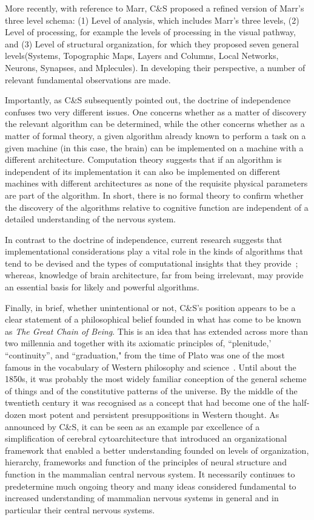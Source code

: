 \documentclass[11pt,3p,twocolumn]{JMN}
\begin{document}
More recently, with reference to Marr, C\&S proposed a refined version of Marr's three level schema: (1) Level of analysis, which includes Marr’s three levels, (2) Level of processing, for example the levels of processing in the visual pathway, and (3) Level of structural organization, for which they proposed seven general levels(Systems, Topographic Maps, Layers and Columns, Local Networks, Neurons, Synapses, and Mplecules). In developing their perspective, a number of relevant fundamental observations are made.

Importantly, as C\&S subsequently pointed out, the doctrine of independence confuses two very different issues. One concerns whether as a matter of discovery the relevant algorithm can be determined, while the other concerns whether as a matter of formal theory, a given algorithm already known to perform a task on a given machine (in this case, the brain) can be implemented on a machine with a different architecture. Computation theory suggests that if an algorithm is independent of its implementation it can also be implemented on different machines with different architectures as none of the requisite physical parameters are part of the algorithm. In short, there is no formal theory to confirm whether the discovery of the algorithms relative to cognitive function are independent of a detailed understanding of the nervous system.

In contrast to the doctrine of independence, current research suggests that implementational considerations play a vital role in the kinds of algorithms that tend to be devised and the types of computational insights that they provide~\citep{Churchland:1992uq}; whereas, knowledge of brain architecture, far from being irrelevant, may provide an essential basis for likely and powerful algorithms.

Finally, in brief, whether unintentional or not, C\&S's position appears to be a clear statement of a philosophical belief founded in what has come to be known as {\it{The Great Chain of Being}}. This is an idea that has extended across more than two millennia and together with its axiomatic principles of, ``plenitude,' ``continuity'', and ``graduation," from the time of Plato was one of the most famous in the vocabulary of Western philosophy and science~\citep{lovejoy48}. Until about the 1850s, it was probably the most widely familiar conception of the general scheme of things and of the constitutive patterns of the universe. By the middle of the twentieth century it was recognised as a concept that had become one of the half-dozen most potent and persistent presuppositions in Western thought. As announced by C\&S, it can be seen as an example par excellence of a simplification of cerebral cytoarchitecture that introduced an organizational framework that enabled a better understanding founded on levels of organization, hierarchy, frameworks and function of the principles of neural structure and function in the mammalian central nervous system. It necessarily continues to predetermine much ongoing theory and many ideas considered fundamental to increased understanding of mammalian nervous systems in general and in particular their central nervous systems.
\end{document}
